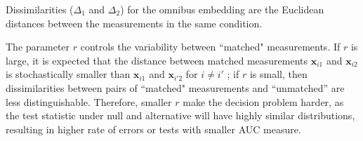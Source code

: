 \documentclass[12pt]{article} %
\begin{document}
 Dissimilarities ($\Delta_1$ and  $\Delta_2$) for the omnibus embedding are the Euclidean distances between the measurements in the same condition.
 
The parameter $r$ controls the variability between ``matched" measurements. If $r$ is large, it is expected that the distance between matched measurements
$\bm{x}_{i1}$ and $\bm{x}_{i2}$ is stochastically smaller than $\bm{x}_{i1}$ and $\bm{x}_{i'2}$ for $i \neq i'$ ; if $r$ is small, then dissimilarities  between pairs of ``matched"  measurements and 
``unmatched'' are less distinguishable. Therefore, smaller $r$ make the decision problem harder, as  the test statistic under null and alternative will have highly similar distributions, resulting in  higher rate of errors or tests with smaller AUC measure.
\end{document}
